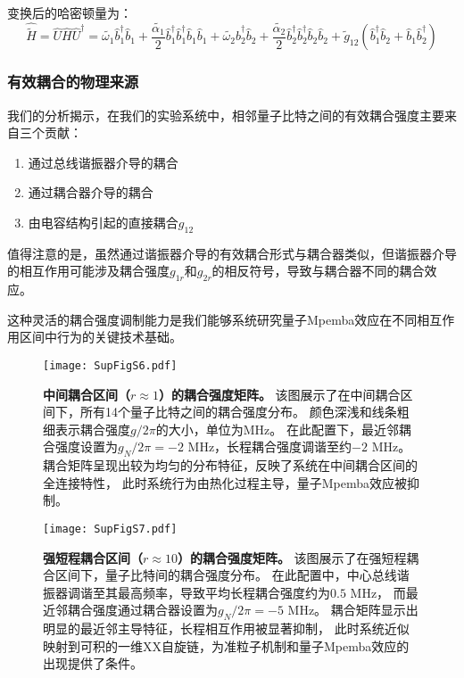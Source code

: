 \documentclass[11pt,a4paper]{article}
\begin{document}
变换后的哈密顿量为：
\[
\hat{\tilde{H}} = \hat{U}\hat{H}\hat{U}^{\dagger} = \widetilde{\omega_1}\hat{b}^{\dagger}_1\hat{b}_1 + \frac{\widetilde{\alpha_1}}{2}\hat{b}^{\dagger}_1\hat{b}^{\dagger}_1\hat{b}_1\hat{b}_1 + \widetilde{\omega_2}\hat{b}^{\dagger}_2\hat{b}_2 + \frac{\widetilde{\alpha_2}}{2}\hat{b}^{\dagger}_2\hat{b}^{\dagger}_2\hat{b}_2\hat{b}_2 + \widetilde{g}_{12}(\hat{b}^{\dagger}_1\hat{b}_2 + \hat{b}_1\hat{b}^{\dagger}_2)
\]

\subsubsection{有效耦合的物理来源}

我们的分析揭示，在我们的实验系统中，相邻量子比特之间的有效耦合强度主要来自三个贡献：
\begin{enumerate}
    \item 通过总线谐振器介导的耦合
    \item 通过耦合器介导的耦合
    \item 由电容结构引起的直接耦合$g_{12}$
\end{enumerate}

值得注意的是，虽然通过谐振器介导的有效耦合形式与耦合器类似，但谐振器介导的相互作用可能涉及耦合强度$g_{1r}$和$g_{2r}$的相反符号，导致与耦合器不同的耦合效应。

这种灵活的耦合强度调制能力是我们能够系统研究量子Mpemba效应在不同相互作用区间中行为的关键技术基础。


\begin{figure}[H]
    \centering
    \texttt{[image: SupFigS6.pdf]}
    \caption{
        \textbf{中间耦合区间（$r \approx 1$）的耦合强度矩阵。}
        该图展示了在中间耦合区间下，所有14个量子比特之间的耦合强度分布。
        颜色深浅和线条粗细表示耦合强度$g/2\pi$的大小，单位为MHz。
        在此配置下，最近邻耦合强度设置为$g_N/2\pi = -2$ MHz，长程耦合强度调谐至约$-2$ MHz。
        耦合矩阵呈现出较为均匀的分布特征，反映了系统在中间耦合区间的全连接特性，
        此时系统行为由热化过程主导，量子Mpemba效应被抑制。
    }
    \label{fig:coupling_matrix_intermediate}
\end{figure}

\begin{figure}[H]
    \centering
    \texttt{[image: SupFigS7.pdf]}
    \caption{
        \textbf{强短程耦合区间（$r \approx 10$）的耦合强度矩阵。}
        该图展示了在强短程耦合区间下，量子比特间的耦合强度分布。
        在此配置中，中心总线谐振器调谐至其最高频率，导致平均长程耦合强度约为$0.5$ MHz，
        而最近邻耦合强度通过耦合器设置为$g_N/2\pi = -5$ MHz。
        耦合矩阵显示出明显的最近邻主导特征，长程相互作用被显著抑制，
        此时系统近似映射到可积的一维XX自旋链，为准粒子机制和量子Mpemba效应的出现提供了条件。
    }
    \label{fig:coupling_matrix_strong_short_range}
\end{figure}
\end{document}
